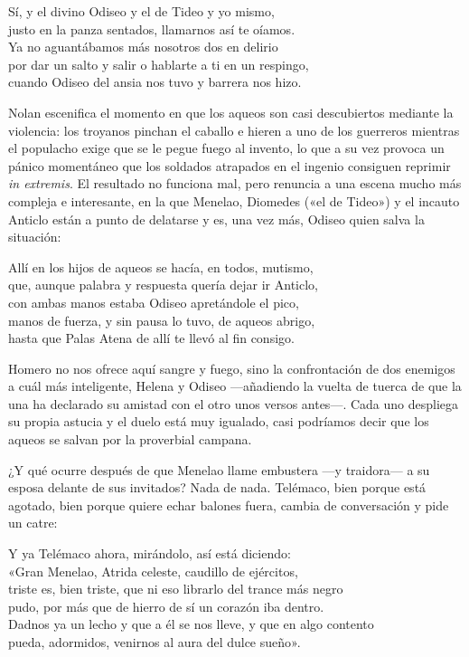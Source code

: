 \begin{versocita}
Sí, y el divino Odiseo y el de Tideo y yo mismo,\\
justo en la panza sentados, llamarnos así te oíamos.\\
Ya no aguantábamos más nosotros dos en delirio\\
por dar un salto y salir o hablarte a ti en un respingo,\\
cuando Odiseo del ansia nos tuvo y barrera nos hizo.
\end{versocita}

Nolan escenifica el momento en que los aqueos son casi descubiertos mediante la violencia: los troyanos pinchan el caballo e hieren a uno de los guerreros mientras el populacho exige que se le pegue fuego al invento, lo que a su vez provoca un pánico momentáneo que los soldados atrapados en el ingenio consiguen reprimir \emph{in extremis}. El resultado no funciona mal, pero renuncia a una escena mucho más compleja e interesante, en la que Menelao, Diomedes («el de Tideo») y el incauto Anticlo están a punto de delatarse y es, una vez más, Odiseo quien salva la situación:

\begin{versocita}
Allí en los hijos de aqueos se hacía, en todos, mutismo,\\
que, aunque palabra y respuesta quería dejar ir Anticlo,\\
con ambas manos estaba Odiseo apretándole el pico,\\
manos de fuerza, y sin pausa lo tuvo, de aqueos abrigo,\\
hasta que Palas Atena de allí te llevó al fin consigo.
\end{versocita}

Homero no nos ofrece aquí sangre y fuego, sino la confrontación de dos enemigos a cuál más inteligente, Helena y Odiseo ---añadiendo la vuelta de tuerca de que la una ha declarado su amistad con el otro unos versos antes---. Cada uno despliega su propia astucia y el duelo está muy igualado, casi podríamos decir que los aqueos se salvan por la proverbial campana.

¿Y qué ocurre después de que Menelao llame embustera ---y traidora--- a su esposa delante de sus invitados? Nada de nada. Telémaco, bien porque está agotado, bien porque quiere echar balones fuera, cambia de conversación y pide un catre:

\begin{versocita}
Y ya Telémaco ahora, mirándolo, así está diciendo:\\
«Gran Menelao, Atrida celeste, caudillo de ejércitos,\\
triste es, bien triste, que ni eso librarlo del trance más negro\\
pudo, por más que de hierro de sí un corazón iba dentro.\\
Dadnos ya un lecho y que a él se nos lleve, y que en algo contento\\
pueda, adormidos, venirnos al aura del dulce sueño».
\end{versocita}

